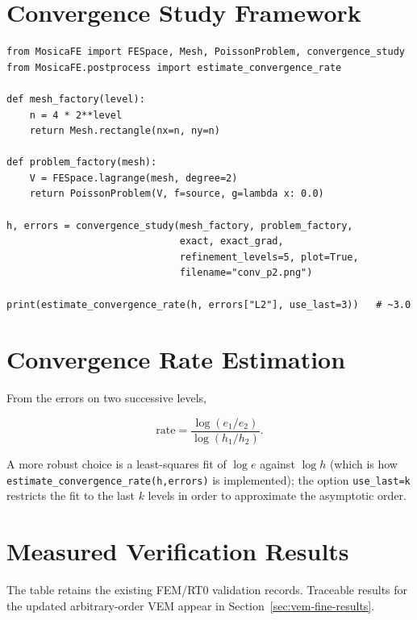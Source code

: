 \documentclass[11pt,oneside]{book}
\theoremstyle{definition}
\theoremstyle{plain}
\newcommand{\code}[1]{\texttt{#1}}
\begin{document}
\section{Convergence Study Framework}

\begin{lstlisting}[language=MosicaFE,caption={Automatic convergence study},label={lst:convstudy}]
from MosicaFE import FESpace, Mesh, PoissonProblem, convergence_study
from MosicaFE.postprocess import estimate_convergence_rate

def mesh_factory(level):
    n = 4 * 2**level
    return Mesh.rectangle(nx=n, ny=n)

def problem_factory(mesh):
    V = FESpace.lagrange(mesh, degree=2)
    return PoissonProblem(V, f=source, g=lambda x: 0.0)

h, errors = convergence_study(mesh_factory, problem_factory,
                              exact, exact_grad,
                              refinement_levels=5, plot=True,
                              filename="conv_p2.png")

print(estimate_convergence_rate(h, errors["L2"], use_last=3))   # ~3.0
\end{lstlisting}

\section{Convergence Rate Estimation}

From the errors on two successive levels,

\begin{equation}
\text{rate}=\frac{\log(e_1/e_2)}{\log(h_1/h_2)} .
\label{eq:rate}
\end{equation}

A more robust choice is a least-squares fit of $\log e$ against $\log h$ (which is
how \code{estimate\_\allowbreak convergence\_\allowbreak rate(h,\allowbreak  errors)} is implemented); the option
\code{use\_\allowbreak last=k} restricts the fit to the last $k$ levels in order to approximate
the asymptotic order.

\section{Measured Verification Results}
\label{sec:verify}

The table retains the existing FEM/RT0 validation records. Traceable results for
the updated arbitrary-order VEM appear in Section~\ref{sec:vem-fine-results}.
\end{document}
